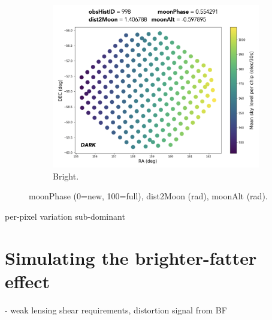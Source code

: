 \begin{figure}
\begin{subfigure}[b]{.3\textwidth}
  \includegraphics[width=\textwidth]{images/sensors/skymodel_bright2.jpg}
  \caption{Bright.}
  \label{fig:sub2}
\end{subfigure}
\caption{moonPhase (0=new, 100=full), dist2Moon (rad), moonAlt (rad).}
\end{figure}

per-pixel variation sub-dominant

\section{Simulating the brighter-fatter effect}

- weak lensing shear requirements, distortion signal from BF

